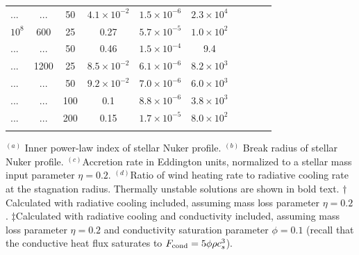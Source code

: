 \documentclass[usenatbib,fleqn]{mn2e}
\begin{document}
\begin{table}
\begin{threeparttable}
\begin{minipage}{18cm}
\begin{tabular}{lccccccccc}
 ... & ... & 50 & $ 4.1 \times 10^{ -2 }$ & $ 1.5 \times 10^{ -6 }$ & $ 2.3 \times 10^{ 4 }$ \\
$    10^{ 8 }$ & 600 & 25 & 0.27 & $ 5.7 \times 10^{ -5 }$ & $ 1.0 \times 10^{ 2 }$ \\
... & ... & 50 & 0.46 & $ 1.5 \times 10^{ -4 }$ & 9.4 \\
... & 1200 & 25 & $ 8.5 \times 10^{ -2 }$ & $ 6.1 \times 10^{ -6 }$ & $ 8.2 \times 10^{ 3 }$ \\
... & ... & 50 & $ 9.2 \times 10^{ -2 }$ & $ 7.0 \times 10^{ -6 }$ & $ 6.0 \times 10^{ 3 }$ \\
... & ... & 100 & 0.1 & $ 8.8 \times 10^{ -6 }$ & $ 3.8 \times 10^{ 3 }$ \\
... & ... & 200 & 0.15 & $ 1.7 \times 10^{ -5 }$ & $ 8.0 \times 10^{ 2 }$ \\
\hline
\label{table:models}  
\end{tabular}
\begin{tablenotes}
\item $^{(a)}$ Inner power-law index of stellar Nuker profile.
  $^{(b)}$ Break radius of stellar Nuker profile.  $^{(c)}$Accretion
  rate in Eddington units, normalized to a stellar mass input
  parameter $\eta = 0.2$.  $^{(d)}$Ratio of wind heating rate to
  radiative cooling rate at the stagnation radius.  Thermally unstable
  solutions are shown in bold text.  $\dagger$Calculated with
  radiative cooling included, assuming mass loss parameter $\eta =
  0.2$.  $\ddagger$Calculated with radiative cooling and conductivity
  included, assuming mass loss parameter $\eta = 0.2$ and conductivity
  saturation parameter $\phi = 0.1$ (recall that the
  conductive heat flux saturates to $F_{\rm cond}=5\phi \rho c_s^3$). 
\end{tablenotes}
\end{minipage}
\end{threeparttable}

\end{table}
\end{document}
